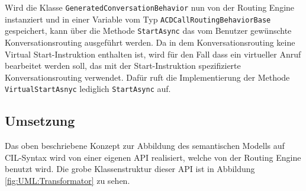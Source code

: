 \newline
Wird die Klasse \texttt{GeneratedConversationBehavior} nun von der Routing Engine instanziert und in einer Variable vom Typ \texttt{ACDCallRoutingBehaviorBase} gespeichert, kann über die Methode \texttt{StartAsync} das vom Benutzer gewünschte Konversationsrouting ausgeführt werden. Da in dem Konversationsrouting keine Virtual Start-Instruktion enthalten ist, wird für den Fall dass ein virtueller Anruf bearbeitet werden soll, das mit der Start-Instruktion spezifizierte Konversationsrouting verwendet. Dafür ruft die Implementierung der Methode \texttt{VirtualStartAsnyc} lediglich \texttt{StartAsync} auf.

\subsection{Umsetzung}
Das oben beschriebene Konzept zur Abbildung des semantischen Modells auf CIL-Syntax wird von einer eigenen API realisiert, welche von der Routing Engine benutzt wird. Die grobe Klassenstruktur dieser API ist in Abbildung \ref{fig:UML:Transformator} zu sehen. 

